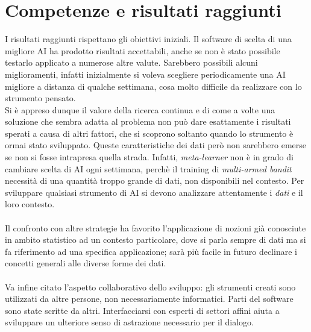 \documentclass{article}
\begin{document}
\section{Competenze e risultati raggiunti}
I risultati raggiunti rispettano gli obiettivi iniziali. Il software di scelta di una migliore AI ha prodotto risultati accettabili, anche se non è stato possibile testarlo applicato a numerose altre valute. Sarebbero possibili alcuni miglioramenti, infatti inizialmente si voleva scegliere periodicamente una AI migliore a distanza di qualche settimana, cosa molto difficile da realizzare con lo strumento pensato.\\ Si è appreso dunque il valore della ricerca continua e di come a volte una soluzione che sembra adatta al problema non può dare esattamente i risultati sperati a causa di altri fattori, che si scoprono soltanto quando lo strumento è ormai stato sviluppato. Queste caratteristiche dei dati però non sarebbero emerse se non si fosse intrapresa quella strada. Infatti, \textit{meta-learner} non è in grado di cambiare scelta di AI ogni settimana, perchè il training di \textit{multi-armed bandit} necessità di una quantità troppo grande di dati, non disponibili nel contesto. Per sviluppare qualsiasi strumento di AI si devono analizzare attentamente i \textit{dati} e il loro contesto.\\~\\ Il confronto con altre strategie ha favorito l'applicazione di nozioni già conosciute in ambito statistico ad un contesto particolare, dove si parla sempre di dati ma si fa riferimento ad una specifica applicazione; sarà più facile in futuro declinare i concetti generali alle diverse forme dei dati.\\~\\ Va infine citato l'aspetto collaborativo dello sviluppo: gli strumenti creati sono utilizzati da altre persone, non necessariamente informatici. Parti del software sono state scritte da altri. Interfacciarsi con esperti di settori affini aiuta a sviluppare un ulteriore senso di astrazione necessario per il dialogo.
\end{document}
